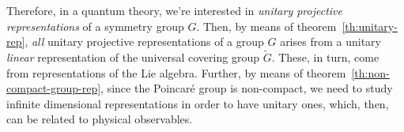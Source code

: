 Therefore, in a quantum theory, we're interested in \emph{unitary projective representations} of a symmetry group $G$. Then, by means of theorem~\ref{th:unitary-rep}, \emph{all} unitary projective representations of a group $G$ arises from a unitary \emph{linear} representation of the universal covering group $\tilde{G}$. These, in turn, come from representations of the Lie algebra. Further, by means of theorem~\ref{th:non-compact-group-rep}, since the Poincaré group is non-compact, we need to study infinite dimensional representations in order to have unitary ones, which, then, can be related to physical observables.
